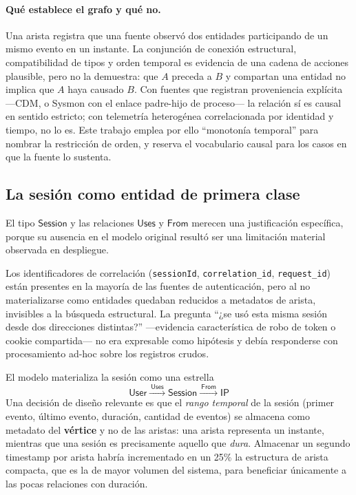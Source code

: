 \documentclass[11pt,a4paper]{article}
\newcommand{\code}[1]{\texttt{#1}}
\begin{document}
\paragraph{Qué establece el grafo y qué no.} Una arista registra que una fuente
observó dos entidades participando de un mismo evento en un instante. La
conjunción de conexión estructural, compatibilidad de tipos y orden temporal es
evidencia de una cadena de acciones plausible, pero no la demuestra: que $A$
preceda a $B$ y compartan una entidad no implica que $A$ haya causado $B$. Con
fuentes que registran proveniencia explícita ---CDM, o Sysmon con el enlace
padre-hijo de proceso--- la relación sí es causal en sentido estricto; con
telemetría heterogénea correlacionada por identidad y tiempo, no lo es. Este
trabajo emplea por ello ``monotonía temporal'' para nombrar la restricción de
orden, y reserva el vocabulario causal para los casos en que la fuente lo
sustenta.

\subsection{La sesión como entidad de primera clase}
\label{sec:sesion}
El tipo $\mathsf{Session}$ y las relaciones $\mathsf{Uses}$ y $\mathsf{From}$
merecen una justificación específica, porque su ausencia en el modelo original
resultó ser una limitación material observada en despliegue.

Los identificadores de correlación (\code{sessionId}, \code{correlation\_id},
\code{request\_id}) están presentes en la mayoría de las fuentes de
autenticación, pero al no materializarse como entidades quedaban reducidos a
metadatos de arista, invisibles a la búsqueda estructural. La pregunta
``¿se usó esta misma sesión desde dos direcciones distintas?'' ---evidencia
característica de robo de token o cookie compartida--- no era expresable como
hipótesis y debía responderse con procesamiento ad-hoc sobre los registros
crudos.

El modelo materializa la sesión como una estrella
\[
\mathsf{User} \xrightarrow{\ \mathsf{Uses}\ } \mathsf{Session}
\xrightarrow{\ \mathsf{From}\ } \mathsf{IP}
\]
Una decisión de diseño relevante es que el \emph{rango temporal} de la sesión
(primer evento, último evento, duración, cantidad de eventos) se almacena como
metadato del \textbf{vértice} y no de las aristas: una arista representa un
instante, mientras que una sesión es precisamente aquello que \emph{dura}.
Almacenar un segundo timestamp por arista habría incrementado en un 25\% la
estructura de arista compacta, que es la de mayor volumen del sistema, para
beneficiar únicamente a las pocas relaciones con duración.
\end{document}
